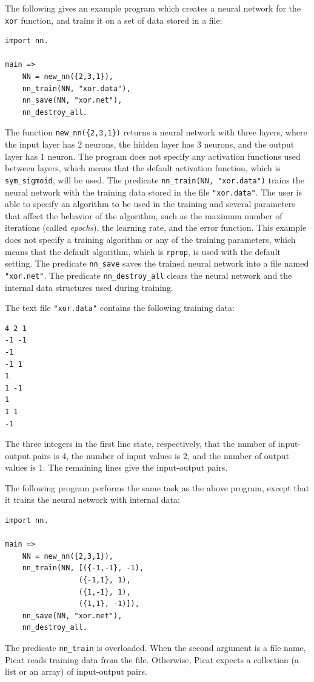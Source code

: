 The following gives an example program which creates a neural network for the \texttt{xor} function,  and trains it on a set of data stored in a file:
\begin{verbatim}
import nn.

main =>
    NN = new_nn({2,3,1}),
    nn_train(NN, "xor.data"),
    nn_save(NN, "xor.net"),
    nn_destroy_all.
\end{verbatim}
The function \texttt{new\_nn(\{2,3,1\})} returns a neural network with three layers, where the input layer has 2 neurons, the hidden layer has 3 neurons, and the output layer has 1 neuron. The program does not specify any activation functions used between layers, which means that the default activation function, which is \texttt{sym\_sigmoid}, will be used. The predicate \texttt{nn\_train(NN, "xor.data")} trains the neural network with the training data stored in the file \texttt{"xor.data"}. The user is able to specify an algorithm to be used in the training and several parameters that affect the behavior of the algorithm, such as the maximum number of iterations (called \textit{epochs}), the learning rate, and the error function. This example does not specify a training algorithm or any of the training parameters, which means that the default algorithm, which is \texttt{rprop}, is used with the default setting. The predicate \texttt{nn\_save} saves the trained neural network into a file named \texttt{"xor.net"}. The predicate \texttt{nn\_destroy\_all} clears the neural network and the internal data structures used during training.

The text file \texttt{"xor.data"} contains the following training data:
\begin{verbatim}
4 2 1
-1 -1
-1
-1 1
1
1 -1
1
1 1
-1
\end{verbatim}
The three integers in the first line state, respectively, that the number of input-output pairs is 4, the number of input values is 2, and the number of output values is 1. The remaining lines give the input-output pairs. 

The following program performs the same task as the above program, except that it trains the neural network with internal data:
\begin{verbatim}
import nn.

main =>
    NN = new_nn({2,3,1}),
    nn_train(NN, [({-1,-1}, -1), 
                 ({-1,1}, 1), 
                 ({1,-1}, 1), 
                 ({1,1}, -1)]),
    nn_save(NN, "xor.net"),
    nn_destroy_all.
\end{verbatim}
The predicate \texttt{nn\_train} is overloaded. When the second argument is a file name, Picat reads training data from the file. Otherwise, Picat expects a collection (a list or an array) of input-output pairs.

